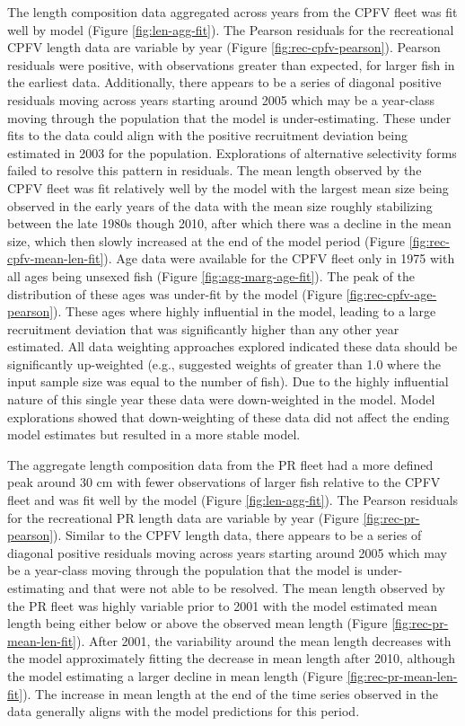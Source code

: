 \documentclass[11pt,
  english,
  letterpaper,
]{article}
\begin{document}
The length composition data aggregated across years from the CPFV fleet was fit well by model (Figure \ref{fig:len-agg-fit}). The Pearson residuals for the recreational CPFV length data are variable by year (Figure \ref{fig:rec-cpfv-pearson}). Pearson residuals were positive, with observations greater than expected, for larger fish in the earliest data. Additionally, there appears to be a series of diagonal positive residuals moving across years starting around 2005 which may be a year-class moving through the population that the model is under-estimating. These under fits to the data could align with the positive recruitment deviation being estimated in 2003 for the population. Explorations of alternative selectivity forms failed to resolve this pattern in residuals. The mean length observed by the CPFV fleet was fit relatively well by the model with the largest mean size being observed in the early years of the data with the mean size roughly stabilizing between the late 1980s though 2010, after which there was a decline in the mean size, which then slowly increased at the end of the model period (Figure \ref{fig:rec-cpfv-mean-len-fit}). Age data were available for the CPFV fleet only in 1975 with all ages being unsexed fish (Figure \ref{fig:agg-marg-age-fit}). The peak of the distribution of these ages was under-fit by the model (Figure \ref{fig:rec-cpfv-age-pearson}). These ages where highly influential in the model, leading to a large recruitment deviation that was significantly higher than any other year estimated. All data weighting approaches explored indicated these data should be significantly up-weighted (e.g., suggested weights of greater than 1.0 where the input sample size was equal to the number of fish). Due to the highly influential nature of this single year these data were down-weighted in the model. Model explorations showed that down-weighting of these data did not affect the ending model estimates but resulted in a more stable model.

The aggregate length composition data from the PR fleet had a more defined peak around 30 cm with fewer observations of larger fish relative to the CPFV fleet and was fit well by the model (Figure \ref{fig:len-agg-fit}). The Pearson residuals for the recreational PR length data are variable by year (Figure \ref{fig:rec-pr-pearson}). Similar to the CPFV length data, there appears to be a series of diagonal positive residuals moving across years starting around 2005 which may be a year-class moving through the population that the model is under-estimating and that were not able to be resolved. The mean length observed by the PR fleet was highly variable prior to 2001 with the model estimated mean length being either below or above the observed mean length (Figure \ref{fig:rec-pr-mean-len-fit}). After 2001, the variability around the mean length decreases with the model approximately fitting the decrease in mean length after 2010, although the model estimating a larger decline in mean length (Figure \ref{fig:rec-pr-mean-len-fit}). The increase in mean length at the end of the time series observed in the data generally aligns with the model predictions for this period.
\end{document}
